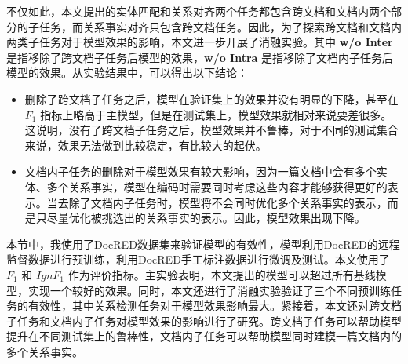 不仅如此，本文提出的实体匹配和关系对齐两个任务都包含跨文档和文档内两个部分的子任务，而关系事实对齐只包含跨文档任务。因此，为了探索跨文档和文档内两类子任务对于模型效果的影响，本文进一步开展了消融实验。其中 \textbf{w/o Inter} 是指移除了跨文档子任务后模型的效果，\textbf{w/o Intra} 是指移除了文档内子任务后模型的效果。从实验结果中，可以得出以下结论：
\begin{itemize}
	\item 删除了跨文档子任务之后，模型在验证集上的效果并没有明显的下降，甚至在 $F_1$ 指标上略高于主模型，但是在测试集上，模型效果就相对来说要差很多。这说明，没有了跨文档子任务之后，模型效果并不鲁棒，对于不同的测试集合来说，效果无法做到比较稳定，有比较大的起伏。
	\item 文档内子任务的删除对于模型效果有较大影响，因为一篇文档中会有多个实体、多个关系事实，模型在编码时需要同时考虑这些内容才能够获得更好的表示。当去除了文档内子任务时，模型将不会同时优化多个关系事实的表示，而是只尽量优化被挑选出的关系事实的表示。因此，模型效果出现下降。
\end{itemize}


\hspace*{\fill}
 
本节中，我使用了DocRED数据集来验证模型的有效性，模型利用DocRED的远程监督数据进行预训练，利用DocRED手工标注数据进行微调及测试。本文使用了 $F_1$ 和 $IgnF_1$ 作为评价指标。主实验表明，本文提出的模型可以超过所有基线模型，实现一个较好的效果。同时，本文还进行了消融实验验证了三个不同预训练任务的有效性，其中关系检测任务对于模型效果影响最大。紧接着，本文还对跨文档子任务和文档内子任务对模型效果的影响进行了研究。跨文档子任务可以帮助模型提升在不同测试集上的鲁棒性，文档内子任务可以帮助模型同时建模一篇文档内的多个关系事实。










